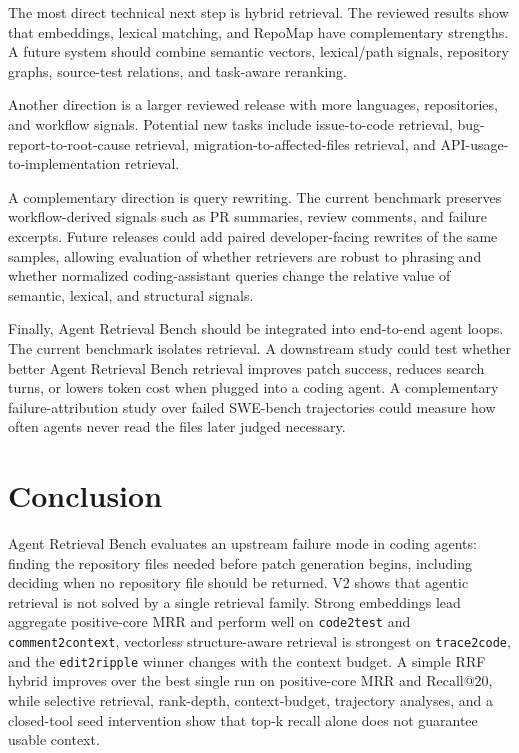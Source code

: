 \documentclass[11pt]{article}
\newcommand{\arb}{Agent Retrieval Bench}
\newcommand{\code}[1]{\texttt{#1}}
\begin{document}
The most direct technical next step is hybrid retrieval. The reviewed results show that embeddings, lexical matching, and RepoMap have complementary strengths. A future system should combine semantic vectors, lexical/path signals, repository graphs, source-test relations, and task-aware reranking.

Another direction is a larger reviewed release with more languages, repositories, and workflow signals. Potential new tasks include issue-to-code retrieval, bug-report-to-root-cause retrieval, migration-to-affected-files retrieval, and API-usage-to-implementation retrieval.

A complementary direction is query rewriting. The current benchmark preserves workflow-derived signals such as PR summaries, review comments, and failure excerpts. Future releases could add paired developer-facing rewrites of the same samples, allowing evaluation of whether retrievers are robust to phrasing and whether normalized coding-assistant queries change the relative value of semantic, lexical, and structural signals.

Finally, \arb{} should be integrated into end-to-end agent loops. The current benchmark isolates retrieval. A downstream study could test whether better \arb{} retrieval improves patch success, reduces search turns, or lowers token cost when plugged into a coding agent. A complementary failure-attribution study over failed SWE-bench trajectories could measure how often agents never read the files later judged necessary.

\section{Conclusion}

\arb{} evaluates an upstream failure mode in coding agents: finding the repository files needed before patch generation begins, including deciding when no repository file should be returned. V2 shows that agentic retrieval is not solved by a single retrieval family. Strong embeddings lead aggregate positive-core MRR and perform well on \code{code2test} and \code{comment2context}, vectorless structure-aware retrieval is strongest on \code{trace2code}, and the \code{edit2ripple} winner changes with the context budget. A simple RRF hybrid improves over the best single run on positive-core MRR and Recall@20, while selective retrieval, rank-depth, context-budget, trajectory analyses, and a closed-tool seed intervention show that top-k recall alone does not guarantee usable context.
\end{document}
